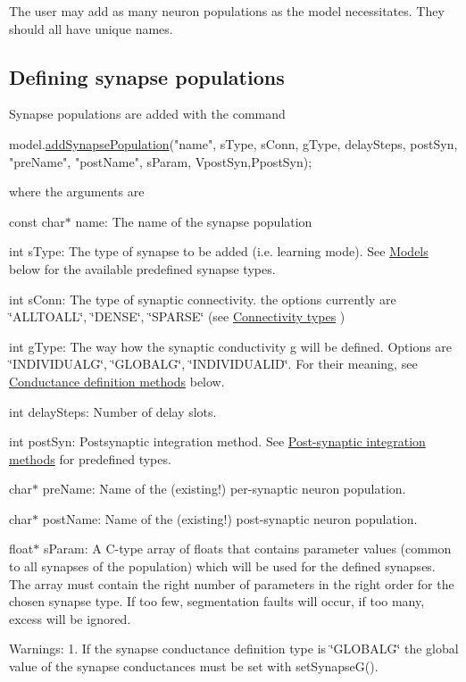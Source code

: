 The user may add as many neuron populations as the model necessitates. They should all have unique names.\hypertarget{Manual_subsect12}{}\subsection{Defining synapse populations}\label{Manual_subsect12}
Synapse populations are added with the command 
\begin{DoxyCode}
model.\hyperlink{classNNmodel_a9dceb36a7d36c82adfdb5642df8f25f7}{addSynapsePopulation}(\textcolor{stringliteral}{"name"}, sType, sConn, gType, delaySteps, postSyn, \textcolor{stringliteral}{"preName"},
       \textcolor{stringliteral}{"postName"}, sParam, VpostSyn,PpostSyn);
\end{DoxyCode}
 where the arguments are \begin{DoxyItemize}
\item {\ttfamily const} {\ttfamily char$\ast$} name\+: The name of the synapse population \item {\ttfamily int} {\ttfamily s\+Type\+:} The type of synapse to be added (i.\+e. learning mode). See \hyperlink{Manual_subsect31}{Models} below for the available predefined synapse types. \item {\ttfamily int} {\ttfamily s\+Conn\+:} The type of synaptic connectivity. the options currently are \char`\"{}\+A\+L\+L\+T\+O\+A\+L\+L\char`\"{}, \char`\"{}\+D\+E\+N\+S\+E\char`\"{}, \char`\"{}\+S\+P\+A\+R\+S\+E\char`\"{} (see \hyperlink{Manual_subsect32}{Connectivity types} ) \item {\ttfamily int} {\ttfamily g\+Type\+:} The way how the synaptic conductivity g will be defined. Options are \char`\"{}\+I\+N\+D\+I\+V\+I\+D\+U\+A\+L\+G\char`\"{}, \char`\"{}\+G\+L\+O\+B\+A\+L\+G\char`\"{}, \char`\"{}\+I\+N\+D\+I\+V\+I\+D\+U\+A\+L\+I\+D\char`\"{}. For their meaning, see \hyperlink{Manual_subsect33}{Conductance definition methods} below. \item {\ttfamily int} {\ttfamily delay\+Steps\+:} Number of delay slots. \item {\ttfamily int} {\ttfamily post\+Syn\+:} Postsynaptic integration method. See \hyperlink{Manual_sect_postsyn}{Post-\/synaptic integration methods} for predefined types. \item {\ttfamily char$\ast$} {\ttfamily pre\+Name\+:} Name of the (existing!) per-\/synaptic neuron population. \item {\ttfamily char$\ast$} {\ttfamily post\+Name\+:} Name of the (existing!) post-\/synaptic neuron population. \item {\ttfamily float$\ast$} {\ttfamily s\+Param\+:} A C-\/type array of floats that contains parameter values (common to all synapses of the population) which will be used for the defined synapses. The array must contain the right number of parameters in the right order for the chosen synapse type. If too few, segmentation faults will occur, if too many, excess will be ignored.\end{DoxyItemize}
Warnings\+: 1. If the synapse conductance definition type is \char`\"{}\+G\+L\+O\+B\+A\+L\+G\char`\"{} the global value of the synapse conductances must be set with set\+Synapse\+G().

